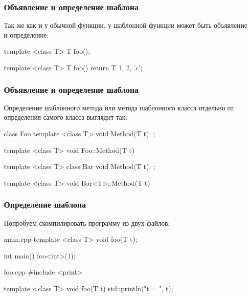 \documentclass[compress, 8pt, aspectratio=169]{beamer}
\begin{document}
  \begin{frame}[fragile]

    \frametitle{Объявление и определение шаблона}

    Так же как и у обычной функции, у шаблонной функции может быть
    объявление и определение:

    \begin{myinplacelisting}[minted language=cpp]
template <class T>
T foo();

template <class T>
T foo() {
    return T {1, 2, 'c'};
}
    \end{myinplacelisting}

  \end{frame}

  \begin{frame}[fragile]

    \frametitle{Объявление и определение шаблона}

    Определение шаблонного метода или метода шаблонного класса
    отдельно от определения самого класса выглядит так:

    \begin{myinplacelisting}[minted language=cpp]
class Foo {
    template <class T>
    void Method(T t);
};

template <class T>
void Foo::Method(T t) {}

template <class T>
class Bar {
    void Method(T t);
};

template <class T>
void Bar<T>::Method(T t) {}
    \end{myinplacelisting}

  \end{frame}

  \begin{frame}[fragile]

    \frametitle{Определение шаблона}

    Попробуем скомпилировать программу из двух файлов:

    \begin{mytitledinplacelisting}[minted language=cpp]{main.cpp}
template <class T>
void foo(T t);

int main() {
    foo<int>(1);
}
    \end{mytitledinplacelisting}

    \begin{mytitledinplacelisting}[minted language=cpp]{foo.cpp}
#include <print>

template <class T>
void foo(T t) {
    std::println("t = {}", t);
}
    \end{mytitledinplacelisting}

  \end{frame}
\end{document}
